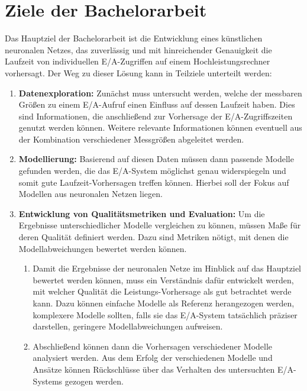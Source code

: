 \documentclass[
	12pt,
	a4paper,
	BCOR10mm,
	DIV14,
	listof=totoc,
	bibliography=totoc,
	headsepline
]{scrreprt}
\begin{document}
\section{Ziele der Bachelorarbeit}
Das Hauptziel der Bachelorarbeit ist die Entwicklung eines künstlichen neuronalen Netzes, das zuverlässig und mit hinreichender Genauigkeit die Laufzeit von individuellen E/A-Zugriffen auf einem Hochleistungsrechner vorhersagt. 
Der Weg zu dieser Lösung kann in Teilziele unterteilt werden:
\begin{enumerate}
	\item \textbf{Datenexploration:} Zunächst muss untersucht werden, welche der messbaren Größen zu einem E/A-Aufruf einen Einfluss auf dessen Laufzeit haben. Dies sind Informationen, die anschließend zur Vorhersage der E/A-Zugriffszeiten genutzt werden können.
	Weitere relevante Informationen können eventuell aus der Kombination verschiedener Messgrößen abgeleitet werden.
	\item \textbf{Modellierung:} Basierend auf diesen Daten müssen dann passende Modelle gefunden werden, die das E/A-System möglichst genau widerspiegeln und somit gute Laufzeit-Vorhersagen treffen können. Hierbei soll der Fokus auf Modellen aus neuronalen Netzen liegen.
	\item \textbf{Entwicklung von Qualitätsmetriken und Evaluation:} Um die Ergebnisse unterschiedlicher Modelle vergleichen zu können, müssen Maße für deren Qualität definiert werden. Dazu sind Metriken nötigt, mit denen die Modellabweichungen bewertet werden können.
	\begin{enumerate}
		\item Damit die Ergebnisse der neuronalen Netze im Hinblick auf das Hauptziel bewertet werden können, muss ein Verständnis dafür entwickelt werden, mit welcher Qualität die Leistungs-Vorhersage als gut betrachtet werde kann.
		Dazu können einfache Modelle als Referenz herangezogen werden, komplexere Modelle sollten, falls sie das E/A-System tatsächlich präziser darstellen, geringere Modellabweichungen aufweisen.
		\item Abschließend können dann die Vorhersagen verschiedener Modelle analysiert werden. Aus dem Erfolg der verschiedenen Modelle und Ansätze können Rückschlüsse über das Verhalten des untersuchten E/A-Systems gezogen werden.
	\end{enumerate}
\end{enumerate}
\end{document}
